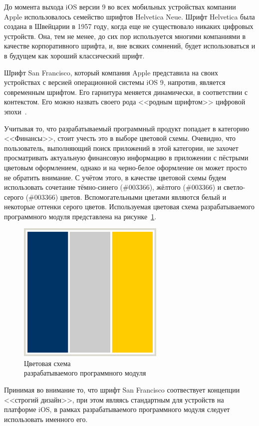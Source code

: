 До момента выхода iOS версии 9 во всех мобильных устройствах компании Apple
использовалось семейство шрифтов Helvetica Neue. Шрифт Helvetica была
создана в Швейцарии в 1957 году, когда еще не существовало никаких цифровых
устройств. Она, тем не менее, до сих пор используется многими компаниями
в качестве корпоративного шрифта, и, вне всяких сомнений, будет использоваться
и в будущем как хороший классический шрифт.

Шрифт San Francisco, который компания Apple представила на своих устройствах
с версией операционной системы iOS 9, напротив, является современным шрифтом.
Его гарнитура меняется динамически, в соответствии с контекстом.
Его можно назвать своего рода <<родным шрифтом>>
цифровой эпохи~\cite{san_francisco_font}.

Учитывая то, что разрабатываемый программный продукт попадает в категорию <<Финансы>>,
стоит учесть это в выборе цветовой схемы. Очевидно, что пользователь,
выполняющий поиск приложений в этой категории, не захочет просматривать
актуальную финансовую информацию в приложении с пёстрыми цветовым оформлением,
однако и на черно-белое оформление он может просто не обратить внимание.
С учётом этого, в качестве цветовой схемы будем использовать сочетание
тёмно-синего (\#003366), жёлтого (\#003366) и светло-серого (\#003366) цветов.
Вспомогательными цветами являются белый и некоторые оттенки серого цветов.
Используемая цветовая схема разрабатываемого программного модуля
представлена на рисунке~\ref{fig:colors}.
\begin{figure}[h!]
  \centering
  \includegraphics[width=70mm]{fig/colors}
  \caption{Цветовая схема \\ разрабатываемого программного модуля}
  \label{fig:colors}
\end{figure}

Принимая во внимание то, что шрифт San Francisco соотвествует концепции <<строгий дизайн>>,
при этом являясь стандартным для устройств на платформе iOS,
в рамках разрабатываемого программного модуля следует использовать именного его.
